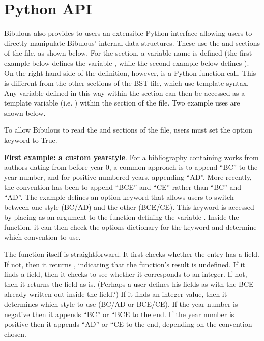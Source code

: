 \documentclass[letterpaper,10pt,english]{sphinxmanual}
\begin{document}
\section{Python API}
\label{guidelines_for_writing_style_templates:python-api}
Bibulous also provides to users an extensible Python interface allowing users to directly manipulate Bibulous' internal data structures. These use the  and  sections of the file, as shown below. For the  section, a variable name is defined (the first example below defines the variable , while the second example below defines ). On the right hand side of the definition, however, is a Python function call. This is different from the other sections of the BST file, which use template syntax. Any variable defined in this way within the  section can then be accessed as a template variable (i.e. ) within the  section of the file. Two example uses are shown below.

To allow Bibulous to read the  and  sections of the file, users must set the option keyword  to True.

\textbf{First example: a custom yearstyle}. For a bibliography containing works from authors dating from before year 0, a common approach is to append ``BC'' to the year number, and for positive-numbered years, appending ``AD''. More recently, the convention has been to append ``BCE'' and ``CE'' rather than ``BC'' and ``AD''. The example defines an option keyword  that allows users to switch between one style (BC/AD) and the other (BCE/CE). This keyword is accessed by placing  as an argument to the  function defining the variable . Inside the function, it can then check the options dictionary for the  keyword and determine which convention to use.

The  function itself is straightforward. It first checks whether the entry has a  field. If not, then it returns , indicating that the function's result is undefined. If it finds a  field, then it checks to see whether it corresponds to an integer. If not, then it returns the field as-is. (Perhaps a user defines his  fields as  with the BCE already written out inside the field?) If it finds an integer value, then it determines which style to use (BC/AD or BCE/CE). If the year number is negative then it appends ``BC'' or ``BCE to the end. If the year number is positive then it appends ``AD'' or ``CE to the end, depending on the convention chosen.
\end{document}
